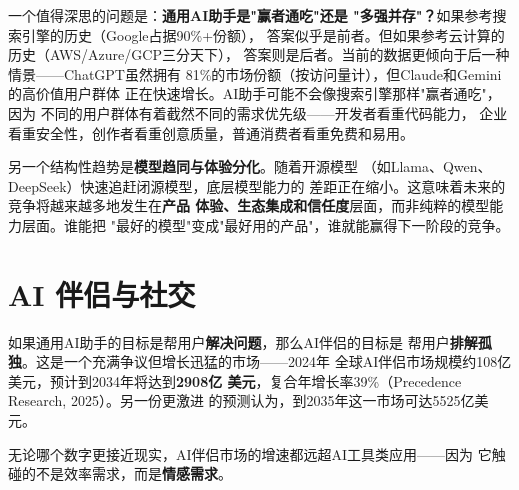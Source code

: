 一个值得深思的问题是：\textbf{通用AI助手是"赢者通吃"还是
"多强并存"？}如果参考搜索引擎的历史（Google占据90\%+份额），
答案似乎是前者。但如果参考云计算的历史（AWS/Azure/GCP三分天下），
答案则是后者。当前的数据更倾向于后一种情景——ChatGPT虽然拥有
81\%的市场份额（按访问量计），但Claude和Gemini的高价值用户群体
正在快速增长。AI助手可能不会像搜索引擎那样"赢者通吃"，因为
不同的用户群体有着截然不同的需求优先级——开发者看重代码能力，
企业看重安全性，创作者看重创意质量，普通消费者看重免费和易用。

另一个结构性趋势是\textbf{模型趋同与体验分化}。随着开源模型
（如Llama、Qwen、DeepSeek）快速追赶闭源模型，底层模型能力的
差距正在缩小。这意味着未来的竞争将越来越多地发生在\textbf{产品
体验、生态集成和信任度}层面，而非纯粹的模型能力层面。谁能把
"最好的模型"变成"最好用的产品"，谁就能赢得下一阶段的竞争。


\section{AI 伴侣与社交}
\label{sec:social-companions}

如果通用AI助手的目标是帮用户\textbf{解决问题}，那么AI伴侣的目标是
帮用户\textbf{排解孤独}。这是一个充满争议但增长迅猛的市场——2024年
全球AI伴侣市场规模约108亿美元，预计到2034年将达到\textbf{2908亿
美元}，复合年增长率39\%（Precedence Research, 2025）。另一份更激进
的预测认为，到2035年这一市场可达5525亿美元。

无论哪个数字更接近现实，AI伴侣市场的增速都远超AI工具类应用——因为
它触碰的不是效率需求，而是\textbf{情感需求}。

